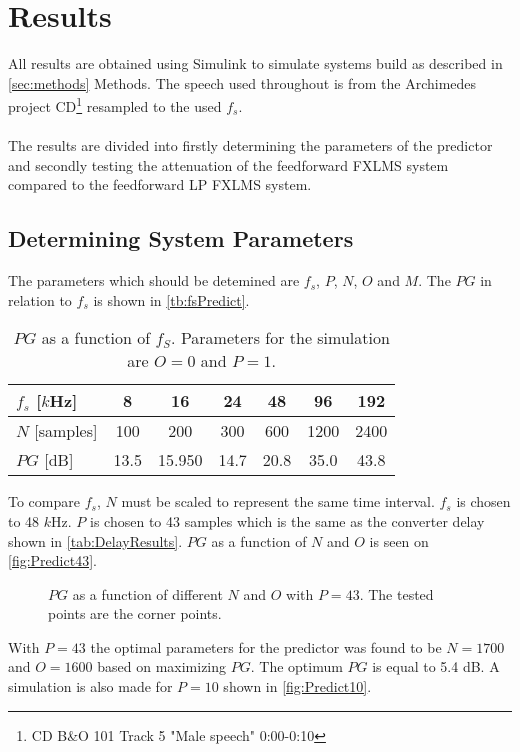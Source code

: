 \section{Results}
All results are obtained using Simulink\textsuperscript{\textregistered} to simulate systems build as described in \autoref{sec:methods} Methods. The speech used throughout is from the Archimedes project CD\footnote{CD B\&O 101 Track 5 "Male speech" 0:00-0:10} resampled to the used $f_s$.  
\\\\
The results are divided into firstly determining the parameters of the predictor and secondly testing the attenuation of the feedforward FXLMS system compared to the feedforward LP FXLMS system.   

\subsection{Determining System Parameters}
The parameters which should be detemined are $f_s$, $P$, $N$, $O$ and $M$.         
The $PG$ in relation to $f_s$ is shown in \autoref{tb:fsPredict}.

\begin{table}[H]
\centering
\begin{tabular}{|l|c|c|c|c|c|c|}
\hline
$f_s$ {[}$k$Hz{]} & 8 & 16 & 24 & 48 & 96 & 192 \\ \hline 
$N$ {[}samples{]} & 100 & 200 & 300 & 600 & 1200 & 2400 \\ \hline 
$PG$ {[}dB{]} & 13.5 & 15.950 & 14.7 & 20.8 & 35.0 & 43.8 \\ \hline
\end{tabular}
\caption{$PG$ as a function of $f_S$. Parameters for the simulation are $O=0$ and $P=1$.}
\label{tb:fsPredict}
\end{table}

To compare $f_s$, $N$ must be scaled to represent the same time interval. $f_s$ is chosen to 48 $k$Hz. $P$ is chosen to 43 samples which is the same as the converter delay shown in \autoref{tab:DelayResults}.  
$PG$ as a function of $N$ and $O$ is seen on \autoref{fig:Predict43}. 

\begin{figure}[H]
	\centering
	
	\caption{$PG$ as a function of different $N$ and $O$ with $P=43$. The tested points are the corner points.}
	\label{fig:Predict43}
\end{figure}
With $P=43$ the optimal parameters for the predictor was found to be $N=1700$ and $O=1600$ based on maximizing $PG$. The optimum $PG$ is equal to 5.4 dB.
A simulation is also made for $P=10$ shown in \autoref{fig:Predict10}.

